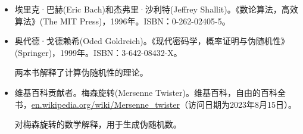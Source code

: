 \begin{itemize}
\item
埃里克·巴赫(Eric Bach)和杰弗里·沙利特(Jeffrey Shallit)。《数论算法，高效算法》(The MIT Press)，1996年。ISBN：0-262-02405-5。

\item
奥代德·戈德赖希(Oded Goldreich)。《现代密码学，概率证明与伪随机性》(Springer)，1999年。ISBN：3-642-08432-X。

\hspace*{\fill}

两本书解释了计算伪随机性的理论。

\hspace*{\fill}

\item
维基百科贡献者。梅森旋转(Mersenne Twister)。维基百科，自由的百科全书，\url{en.wikipedia.org/wiki/Mersenne_twister}（访问日期为2023年8月15日）。

\hspace*{\fill}

对梅森旋转的数学解释，用于生成伪随机数。
\end{itemize}
